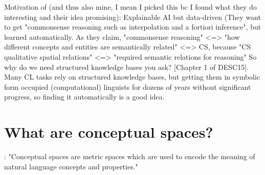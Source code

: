 Motivation of \textcite{Derrac2015} (and thus also mine, I mean I picked this bc I found what they do interesting and their idea promising): Explainable AI but data-driven (They want to get "commonsense reasoning such as interpolation and a fortiori inference", but learned automatically. As they claim, "commonsense reasoning" <=> "how different concepts and entities are semantically related" <=> CS, because "CS qualitative spatial relations" <=> "required semantic relations for reasoning"
So why do we need structured knowledge bases you ask? [Chapter 1 of DESC15]. Many CL tasks rely on structured  knowledge bases, but getting them in symbolic form occupied (computational) linguists for dozens of years without significant progress, so finding it automatically is a good idea.

\section{What are conceptual spaces? }

\cite{Derrac2015}: "Conceptual spaces \cite{Gardenfors2000} are metric spaces which are used to encode the meaning of natural language concepts and properties." %



